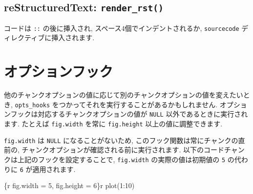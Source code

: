 \documentclass[
  lualatex,ja=standard,jafont=noto-otf]{bxjsreport}
\newenvironment{Shaded}{\begin{snugshade}}{\end{snugshade}}
\newcommand{\AttributeTok}[1]{\textcolor[rgb]{0.13,0.29,0.53}{#1}}
\newcommand{\ControlFlowTok}[1]{\textcolor[rgb]{0.13,0.29,0.53}{\textbf{#1}}}
\newcommand{\FunctionTok}[1]{\textcolor[rgb]{0.13,0.29,0.53}{\textbf{#1}}}
\newcommand{\NormalTok}[1]{#1}
\newcommand{\OtherTok}[1]{\textcolor[rgb]{0.56,0.35,0.01}{#1}}
\newcommand{\SpecialCharTok}[1]{\textcolor[rgb]{0.81,0.36,0.00}{\textbf{#1}}}
\begin{document}
\hypertarget{restructuredtext-render_rst}{%
\subsection{\texorpdfstring{reStructuredText:
\texttt{render\_rst()}}{reStructuredText: render\_rst()}}\label{restructuredtext-render_rst}}

コードは \texttt{::} の後に挿入され, スペース4個でインデントされるか,
\texttt{sourcecode} ディレクティブに挿入されます.

\hypertarget{ux30aaux30d7ux30b7ux30e7ux30f3ux30d5ux30c3ux30af}{%
\section{オプションフック}\label{ux30aaux30d7ux30b7ux30e7ux30f3ux30d5ux30c3ux30af}}

他のチャンクオプションの値に応じて別のチャンクオプションの値を変えたいとき,
\texttt{opts\_hooks} をつかってそれを実行することがあるかもしれません.
オプションフックは対応するチャンクオプションの値が \texttt{NULL}
以外であるときに実行されます. たとえば \texttt{fig.width} を常に
\texttt{fig.height} 以上の値に調整できます.

\begin{Shaded}
\end{Shaded}

\texttt{fig.width} は \texttt{NULL} になることがないため,
このフック関数は常にチャンクの直前の,
チャンクオプションが確認される前に実行されます.
以下のコードチャンクは上記のフックを設定することで, \texttt{fig.width}
の実際の値は初期値の \texttt{5} の代わりに \texttt{6} が適用されます.

\begin{Shaded}
\begin{Highlighting}[numbers=left,,]
\NormalTok{\textasciigrave{}\textasciigrave{}\textasciigrave{}\{r fig.width = 5, fig.height = 6\}\textasciigrave{}r \textquotesingle{}\textquotesingle{}\textasciigrave{}}
\NormalTok{plot(1:10)}
\NormalTok{\textasciigrave{}\textasciigrave{}\textasciigrave{}}
\end{Highlighting}
\end{Shaded}
\end{document}
